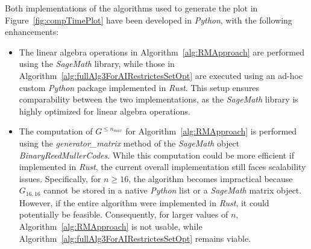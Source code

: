 \documentclass[11pt]{llncs}
\begin{document}
\begin{table}[H]
\centering
{}
\caption{Pre-computation time (in seconds) for $G^{\leq n_{max}}$ for $n_{max}$ from $1$ to $12$.}\label{table:preComputationTimes}
\end{table}

Both implementations of the algorithms used to generate the plot in Figure~\ref{fig:compTimePlot} have been developed in \textit{Python}, with the following enhancements:
\begin{itemize}
\item The linear algebra operations in Algorithm~\ref{alg:RMApproach} are performed using the \textit{SageMath} library, while those in Algorithm~\ref{alg:fullAlg3ForAIRestrictesSetOpt} are executed using an ad-hoc custom \textit{Python} package implemented in \textit{Rust}. This setup ensures comparability between the two implementations, as the \textit{SageMath} library is highly optimized for linear algebra operations.
\item The computation of $G^{\leq n_{max}}$ for Algorithm~\ref{alg:RMApproach} is performed using the \textit{generator\_matrix} method of the \textit{SageMath} object \textit{BinaryReedMullerCodes}. While this computation could be more efficient if implemented in \textit{Rust}, the current overall implementation still faces scalability issues. Specifically, for $n \geq 16$, the algorithm becomes impractical because $G_{16,16}$ cannot be stored in a native \textit{Python} list or a \textit{SageMath} matrix object. However, if the entire algorithm were implemented in \textit{Rust}, it could potentially be feasible. Consequently, for larger values of $n$, Algorithm~\ref{alg:RMApproach} is not usable, while Algorithm~\ref{alg:fullAlg3ForAIRestrictesSetOpt} remains viable.
\end{itemize}

\setcounter{algorithm}{2} 
\end{document}
